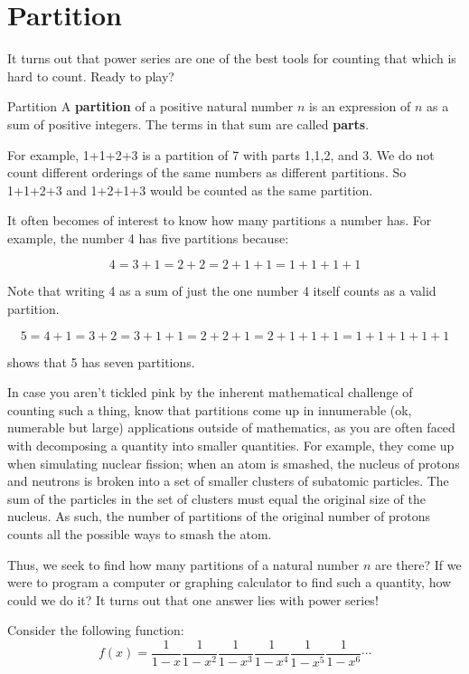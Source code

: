 \section{Partition }

It turns out that power series are one of the best tools for counting that which is hard to count.  Ready to play? 

\begin{definition}{Partition}
A {\bf partition} of a positive natural number $n$ is an expression of $n$ as a sum of positive integers.  The terms in that sum are called {\bf parts}.
\end{definition} 

For example, 1+1+2+3 is a partition of 7 with parts 1,1,2, and 3.  We do not count different orderings of the same numbers as different partitions.  So 1+1+2+3 and 1+2+1+3 would be counted as the same partition.

It often becomes of interest to know how many partitions a number has.  For example, the number 4 has five partitions because:

$$ 4=3+1=2+2=2+1+1=1+1+1+1$$

Note that writing 4 as a sum of just the one number 4 itself counts as a valid partition.

$$ 5=4+1=3+2=3+1+1=2+2+1=2+1+1+1=1+1+1+1+1$$

shows that 5 has seven partitions.

In case you aren't tickled pink by the inherent mathematical challenge of counting such a thing, know that partitions come up in innumerable (ok, numerable but large) applications outside of mathematics, as you are often faced with decomposing a quantity into smaller quantities.  For example, they come up when simulating nuclear fission; when an atom is smashed, the nucleus of protons and neutrons is broken into a set of smaller clusters of subatomic particles. The sum of the particles in the set of clusters must equal the original size of the nucleus. As such, the number of partitions of the original number of protons counts all the possible ways to smash the atom.

Thus, we seek to find how many partitions of a natural number $n$ are there?  If we were to program a computer or graphing calculator to find such a quantity, how could we do it?  It turns out that one answer lies with power series!

Consider the following function: $$f(x)=\frac{1}{1-x}\frac{1}{1-x^2}\frac{1}{1-x^3}\frac{1}{1-x^4}\frac{1}{1-x^5}\frac{1}{1-x^6}\cdots$$

